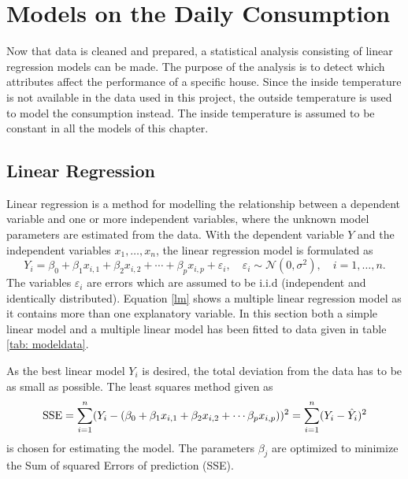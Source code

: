 \chapter{Models on the Daily Consumption}
\label{chap: daily}
Now that data is cleaned and prepared, a statistical analysis consisting of linear regression models can be made. The purpose of the analysis is to detect which attributes affect the performance of a specific house. Since the inside temperature is not available in the data used in this project, the outside temperature is used to model the consumption instead. The inside temperature is assumed to be constant in all the models of this chapter.

\section{Linear Regression}
Linear regression is a method for modelling the relationship between a dependent variable and one or more independent variables, where the unknown model parameters are estimated from the data. With the dependent variable $Y$ and the independent variables $x_1, \dots, x_n$, the linear regression model is formulated as
\begin{equation}
    Y_i = \beta_0 + \beta_1 x_{i,1} + \beta_2 x_{i,2} + \cdots + \beta_p x_{i,p} + \varepsilon_i, \quad \varepsilon_i \sim \mathcal{N}(0,\sigma^2), \quad i = 1,\dots, n. \label{lm}
\end{equation}
The variables $\varepsilon_i$ are errors which are assumed to be i.i.d (independent and identically distributed). Equation \eqref{lm} shows a multiple linear regression model as it contains more than one explanatory variable. In this section both a simple linear model and a multiple linear model has been fitted to data given in table \ref{tab: modeldata}.

\noindent As the best linear model $Y_i$ is desired, the total deviation from the data has to be as small as possible. The least squares method given as
\begin{equation}
    \text{SSE} = \sum_{i=1}^n (Y_i - (\beta_0 + \beta_1 x_{i,1} + \beta_2 x_{i,2} + \cdots  \beta_p x_{i,p}))^2 = \sum_{i=1}^n (Y_i - \Hat{Y}_i)^2
\end{equation}
is chosen for estimating the model. The parameters $\beta_j$ are optimized to minimize the Sum of squared Errors of prediction (SSE).

